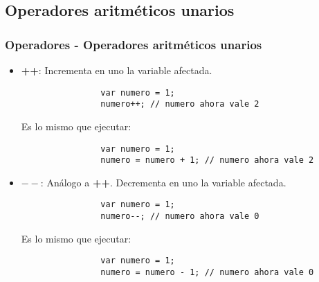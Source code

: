 \documentclass[handout, 10pt]{beamer}
\begin{document}
\subsection{Operadores aritméticos unarios}
\begin{frame}[fragile]
	\frametitle{Operadores - Operadores aritméticos unarios}
	\begin{itemize}
		\pause \item \textbf{++}: Incrementa en uno la variable afectada.
			\begin{lstlisting}
				var numero = 1;
				numero++; // numero ahora vale 2
			\end{lstlisting}
			\pause Es lo mismo que ejecutar:
			\begin{lstlisting}
				var numero = 1;
				numero = numero + 1; // numero ahora vale 2
			\end{lstlisting}
		\pause \item \textbf{$--$}: Análogo a \textbf{++}. Decrementa en uno la variable afectada.
			\begin{lstlisting}
				var numero = 1;
				numero--; // numero ahora vale 0
			\end{lstlisting}
			\pause Es lo mismo que ejecutar:
			\begin{lstlisting}
				var numero = 1;
				numero = numero - 1; // numero ahora vale 0
			\end{lstlisting}
	\end{itemize}
\end{frame}
\end{document}
